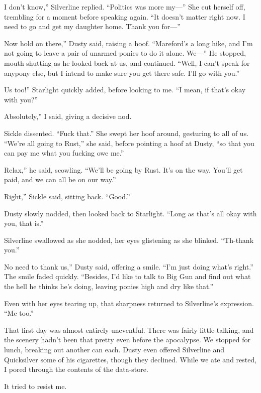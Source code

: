 \leavevmode{}I don’t know,” Silverline replied. “Politics was more my—” She cut herself off, trembling for a moment before speaking again. “It doesn’t matter right now. I need to go and get my daughter home. Thank you for—”

\leavevmode{}Now hold on there,” Dusty said, raising a hoof. “Mareford’s a long hike, and I’m not going to leave a pair of unarmed ponies to do it alone. We—” He stopped, mouth shutting as he looked back at us, and continued. “Well, I can’t speak for anypony else, but I intend to make sure you get there safe. I’ll go with you.”

\leavevmode{}Us too!” Starlight quickly added, before looking to me. “I mean, if that’s okay with you?”

\leavevmode{}Absolutely,” I said, giving a decisive nod.

Sickle dissented. “Fuck that.” She swept her hoof around, gesturing to all of us. “We’re all going to Rust,” she said, before pointing a hoof at Dusty, “so that you can pay me what you fucking owe me.”

\leavevmode{}Relax,” he said, scowling. “We’ll be going by Rust. It’s on the way. You’ll get paid, and we can all be on our way.”

\leavevmode{}Right,” Sickle said, sitting back. “Good.”

Dusty slowly nodded, then looked back to Starlight. “Long as that’s all okay with you, that is.”

Silverline swallowed as she nodded, her eyes glistening as she blinked. “Th-thank you.”

\leavevmode{}No need to thank us,” Dusty said, offering a smile. “I’m just doing what’s right.” The smile faded quickly. “Besides, I’d like to talk to Big Gun and find out what the hell he thinks he’s doing, leaving ponies high and dry like that.”

Even with her eyes tearing up, that sharpness returned to Silverline’s expression. “Me too.”

{\br}%
That first day was almost entirely uneventful. There was fairly little talking, and the scenery hadn’t been that pretty even before the apocalypse. We stopped for lunch, breaking out another can each. Dusty even offered Silverline and Quicksilver some of his cigarettes, though they declined. While we ate and rested, I pored through the contents of the data-store.

It tried to resist me.

